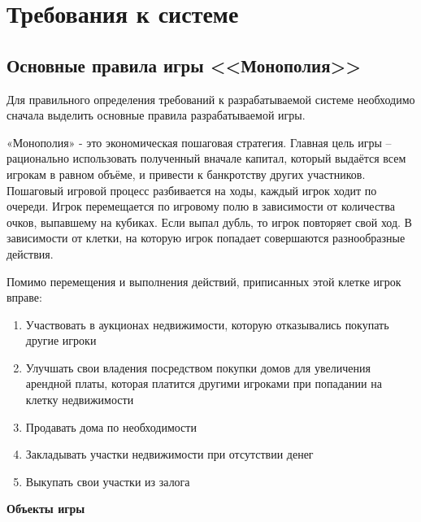 \newpage
\section{Требования к системе}
\subsection{Основные правила игры <<Монополия>>}
Для правильного определения требований к разрабатываемой системе необходимо сначала выделить основные правила разрабатываемой игры.

«Монополия» - это экономическая пошаговая стратегия. Главная цель игры – рационально использовать полученный вначале капитал, который выдаётся всем игрокам в равном объёме, и привести к банкротству других участников. Пошаговый игровой процесс разбивается на ходы, каждый игрок ходит по очереди. Игрок перемещается по игровому полю в зависимости от количества очков, выпавшему на кубиках. Если выпал дубль, то игрок повторяет свой ход. В зависимости от клетки, на которую игрок попадает совершаются разнообразные действия.

Помимо перемещения и выполнения действий, приписанных этой клетке игрок вправе:
\begin{spacing}{0.9}
\begin{enumerate}
    \item Участвовать в аукционах недвижимости, которую отказывались покупать другие игроки 
    \item Улучшать свои владения посредством покупки домов для увеличения арендной платы, которая платится другими игроками при попадании на клетку недвижимости
    \item Продавать дома по необходимости
    \item Закладывать участки недвижимости при отсутствии денег
    \item Выкупать свои участки из залога
\end{enumerate}
\end{spacing}

\textbf{Объекты игры}

